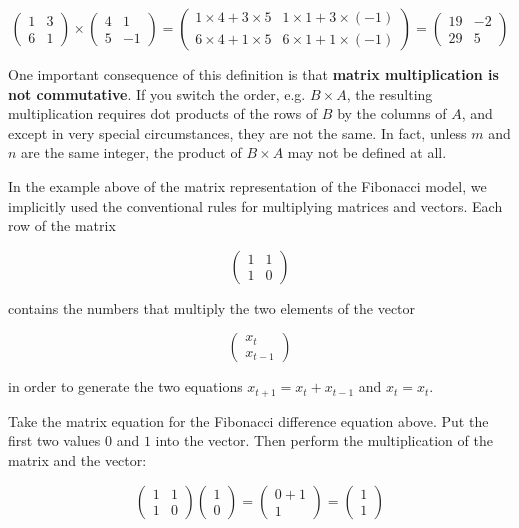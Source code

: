 \documentclass[
  letterpaper,
  DIV=11,
  numbers=noendperiod]{scrreprt}
\begin{document}
\[
\left(\begin{array}{cc}1 & 3 \\ 6 & 1\end{array}\right) \times \left(\begin{array}{cc}4 & 1 \\5 & -1 \end{array}\right) = \left(\begin{array}{cc}1 \times 4 + 3 \times 5 & 1 \times 1 +3 \times (-1) \\ 6 \times 4+ 1 \times 5 & 6 \times 1+1 \times (-1) \end{array}\right) = \left(\begin{array}{cc}19 & -2 \\ 29 & 5 \end{array}\right)
\]

One important consequence of this definition is that \textbf{matrix
multiplication is not commutative}. If you switch the order, e.g.
\(B \times A\), the resulting multiplication requires dot products of
the rows of \(B\) by the columns of \(A\), and except in very special
circumstances, they are not the same. In fact, unless \(m\) and \(n\)
are the same integer, the product of \(B \times A\) may not be defined
at all.

In the example above of the matrix representation of the Fibonacci
model, we implicitly used the conventional rules for multiplying
matrices and vectors. Each row of the matrix

\[
\left(\begin{array}{cc}1 & 1\\1 & 0\end{array}\right)
\]

contains the numbers that multiply the two elements of the vector

\[
\left(\begin{array}{c}x_t \\ x_{t-1} \end{array}\right)
\]

in order to generate the two equations \(x_{t+1} = x_t + x_{t-1}\) and
\(x_t = x_t\).

Take the matrix equation for the Fibonacci difference equation above.
Put the first two values \(0\) and \(1\) into the vector. Then perform
the multiplication of the matrix and the vector:

\[
\left(\begin{array}{cc}1 & 1\\1 & 0\end{array}\right)\left(\begin{array}{c}1\\ 0\end{array}\right) = \left(\begin{array}{c}0+ 1 \\ 1 \end{array}\right)  = \left(\begin{array}{c}1 \\ 1 \end{array}\right)
\]
\end{document}
